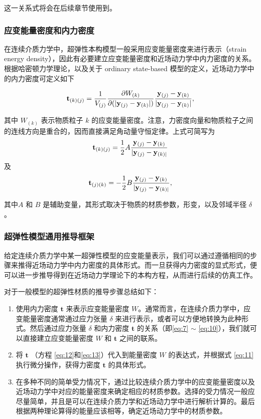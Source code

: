 这一关系式将会在后续章节使用到。

\subsubsection{应变能量密度和内力密度}
在连续介质力学中，超弹性本构模型一般采用应变能量密度来进行表示（strain energy density），因此有必要建立应变能量密度和近场动力学中内力密度的关系。根据哈密顿力学理论，以及关于 ordinary state-based 模型的定义，近场动力学中的内力密度可定义如下

\begin{equation}
\mathbf{t}_{(k)(j)}=\frac{1}{V_{(j)}}\frac{\partial W_{(k)}}{\partial (|\mathbf{y}_{(j)}-\mathbf{y}_{(k)}|)}\frac{\mathbf{y}_{(j)}-\mathbf{y}_{(k)}}{|\mathbf{y}_{(j)}-\mathbf{y}_{(k)}|},
\label{eq:11}
\end{equation}

其中 $W_{(k)}$ 表示物质粒子 $k$ 的应变能量密度。注意，力密度向量和物质粒子之间的连线方向是重合的，因而直接满足角动量守恒定律。上式可简写为
\begin{equation}
\mathbf{t}_{(k)(j)} = \frac{1}{2}A\frac{\mathbf{y}_{(j)}-\mathbf{y}_{(k)}}{|\mathbf{y}_{(j)}-\mathbf{y}_{(k)|}}
\label{eq:12}
\end{equation}
及
\begin{equation}
\mathbf{t}_{(j)(k)} = -\frac{1}{2}B\frac{\mathbf{y}_{(j)}-\mathbf{y}_{(k)}}{|\mathbf{y}_{(j)}-\mathbf{y}_{(k)|}},
\label{eq:13}
\end{equation}

其中$A$ 和 $B$ 是辅助变量，其形式取决于物质的材质参数，形变，以及邻域半径 $\delta$。

\subsubsection{超弹性模型通用推导框架}
给定连续介质力学中某一超弹性模型的应变能量表示，我们可以通过遵循相同的步骤来推得近场动力学中内力密度的具体形式。而一旦获得内力密度的显式形式，便可以进一步推导得到在近场动力学理论下的本构方程，从而进行后续的仿真工作。

对于一般模型的超弹性材质的推导步骤总结如下：
\begin{enumerate}
  \item 使用内力密度 $\mathbf{t}$ 来表示应变能量密度 $W$。通常而言，在连续介质力学中，应变能量密度通常通过应力张量 $\delta$ 来进行表示，或者可以方便地转换为此种形式。然后通过应力张量 $\delta$ 和内力密度 $\mathbf{t}$ 的关系（即\ref{eq:7} $\sim$ \ref{eq:10}），我们就可以直接建立应变能量密度 $W$ 和 $\mathbf{t}$ 之间的联系。
  \item 将 $\mathbf{t}$ （方程 \ref{eq:12}和\ref{eq:13}）代入到能量密度 $W$ 的表达式，并根据式 \ref{eq:11} 执行微分操作，获得力密度 $\mathbf{t}$ 的具体形式。
  \item 在多种不同的简单受力情况下，通过比较连续介质力学中的应变能量密度以及近场动力学中对应的能量密度来确定相应的材质参数。选择的受力情况一般应尽量简单，并且是可以在连续介质力学和近场动力学中进行解析计算的。最后根据两种理论算得的能量应该相等，确定近场动力学中的材质参数。
\end{enumerate}

